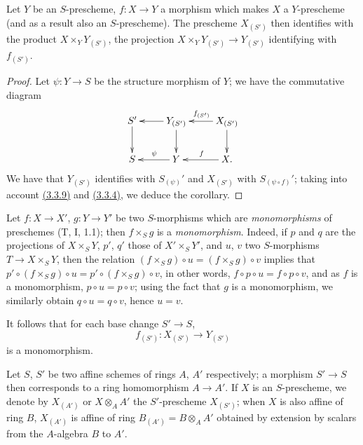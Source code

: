 \begin{cor}[3.3.11]
\label{cor-1.3.3.11}
Let $Y$ be an $S$-prescheme, $f:X\to Y$ a morphism which makes $X$ a
$Y$-prescheme (and as a result also an $S$-prescheme). The prescheme $X_{(S')}$
then identifies with the product $X\times_Y Y_{(S')}$, the projection
$X\times_Y Y_{(S')}\to Y_{(S')}$ identifying with $f_{(S')}$.
\end{cor}

\begin{proof}
\label{proof-cor-1.3.3.11}
Let $\psi:Y\to S$ be the structure morphism of $Y$; we have the commutative
diagram
\[
  \xymatrix{
    S'\ar[d] &
    Y_{(S')}\ar[l]\ar[d] &
    X_{(S')}\ar[l]_{f_{(S')}}\ar[d]\\
    S &
    Y\ar[l]_\psi &
    X\ar[l]_f.
  }
\]
We have that $Y_{(S')}$ identifies with $S_{(\psi)}'$ and $X_{(S')}$ with
$S_{(\psi\circ f)}'$; taking into account \hyperref[prop-1.3.3.9]{(3.3.9)} and
\hyperref[cor-1.3.3.4]{(3.3.4)}, we deduce the corollary.
\end{proof}

\begin{env}[3.3.12]
\label{env-1.3.3.12}
Let $f:X\to X'$, $g:Y\to Y'$ be two $S$-morphisms which are {\it monomorphisms}
of preschemes (T, I, 1.1); then $f\times_S g$ is a {\it monomorphism}. Indeed,
if $p$ and $q$ are the projections of $X\times_S Y$, $p'$, $q'$ those of
$X'\times_S Y'$, and $u$, $v$ two $S$-morphisms $T\to X\times_S Y$, then the
relation $(f\times_S g)\circ u=(f\times_S g)\circ v$ implies that
$p'\circ(f\times_S g)\circ u=p'\circ(f\times_S g)\circ v$, in other words,
$f\circ p\circ u=f\circ p\circ v$, and as $f$ is a monomorphism,
$p\circ u=p\circ v$; using the fact that $g$ is a monomorphism, we similarly
obtain $q\circ u=q\circ v$, hence $u=v$.

It follows that for each base change $S'\to S$,
\[
  f_{(S')}:X_{(S')}\longrightarrow Y_{(S')}
\]
is a monomorphism.
\end{env}

\begin{env}[3.3.13]
\label{env-1.3.3.13}
Let $S$, $S'$ be two affine schemes of rings $A$, $A'$ respectively; a morphism
$S'\to S$ then corresponds to a ring homomorphism $A\to A'$. If $X$ is an
$S$-prescheme, we denote by $X_{(A')}$ or $X\otimes_A A'$ the $S'$-prescheme
$X_{(S')}$; when $X$ is also affine of ring $B$, $X_{(A')}$ is affine of ring
$B_{(A')}=B\otimes_A A'$ obtained by extension by scalars from the $A$-algebra
$B$ to $A'$.
\end{env}

